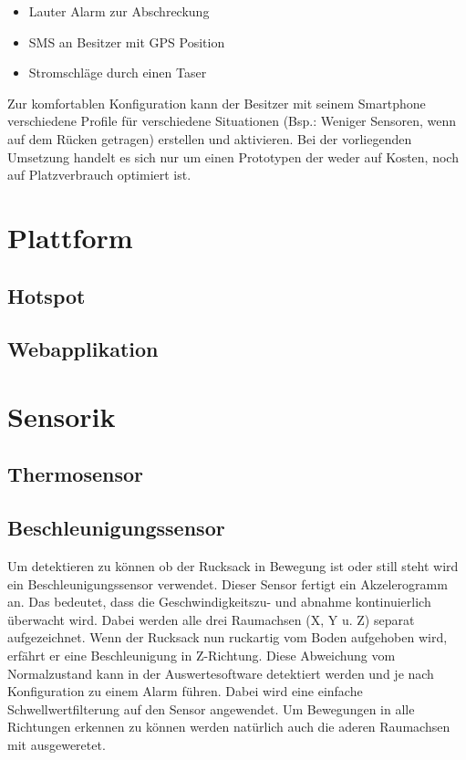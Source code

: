 \documentclass{sigchi}
\begin{document}
\begin{itemize} 
\item Lauter Alarm zur Abschreckung
\item SMS an Besitzer mit GPS Position
\item Stromschläge durch einen Taser
\end{itemize}

Zur komfortablen Konfiguration kann der Besitzer mit seinem
Smartphone verschiedene Profile für verschiedene Situationen 
(Bsp.: Weniger Sensoren, wenn auf dem Rücken getragen)
erstellen und aktivieren. Bei der vorliegenden Umsetzung handelt
es sich nur um einen Prototypen der weder auf Kosten, noch auf
Platzverbrauch optimiert ist.

\section{Plattform}


\subsection{Hotspot}

\subsection{Webapplikation}

\section{Sensorik}

\subsection{Thermosensor}

\subsection{Beschleunigungssensor}
Um detektieren zu können ob der Rucksack in Bewegung ist oder
still steht wird ein Beschleunigungssensor verwendet. Dieser
Sensor fertigt ein Akzelerogramm an. Das bedeutet, dass die
Geschwindigkeitszu- und abnahme kontinuierlich überwacht wird.
Dabei werden alle drei Raumachsen (X, Y u. Z) separat aufgezeichnet.
Wenn der Rucksack nun ruckartig vom Boden aufgehoben wird, erfährt er
eine Beschleunigung in Z-Richtung. Diese Abweichung vom
Normalzustand kann in der Auswertesoftware detektiert werden
und je nach Konfiguration zu einem Alarm führen. Dabei wird 
eine einfache Schwellwertfilterung auf den Sensor angewendet.
Um Bewegungen in alle Richtungen erkennen zu können werden natürlich
auch die aderen Raumachsen mit ausgeweretet.
\end{document}
